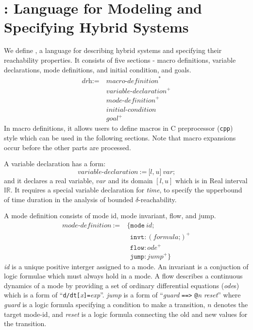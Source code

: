 \section{\drh{}: Language for Modeling and Specifying Hybrid Systems}

We define \drh{}, a language for describing hybrid systems and
specifying their reachability properties. It consists of five sections
- macro definitions, variable declarations, mode definitions, and
initial condition, and goals.
\begin{align*}
  \textit{drh} := \ & \textit{macro-definition}^*\\
                    & \textit{variable-declaration}^+\\
                    & \textit{mode-definition}^+\\
                    & \textit{initial-condition}\\
                    & \textit{goal}^+
\end{align*}
In macro definitions, it allows users to define macros in C
preprocessor (\texttt{cpp}) style which can be used in the following
sections. Note that macro expansions occur before the other parts are processed.

A variable declaration has a form:
\[
\textit{variable-declaration} \ := \ \texttt{[}
                                     \textit{l}
                                     \texttt{,}
                                     \ \textit{u}
                                     \texttt{]}
                                     \ \textit{var}
                                     \texttt{;}
\]
and it declares a real variable, $var$ and its domain $[l, u]$ which
is in Real interval $\mathbb{IR}$. It requires a special variable
declaration for \textit{time}, to specify the upperbound of time
duration in the analysis of bounded $\delta$-reachability.

A mode definition consists of mode id, mode invariant, flow, and jump.
\begin{align*}
  \textit{mode-definition} \ := & \ \texttt{\{}
                                    \texttt{mode} \ \textit{id}\texttt{;}\\
                           & \ \ \  \texttt{invt}:(\textit{formula} \texttt{;})^+\\
                           & \ \ \  \texttt{flow}:\textit{ode}^+\\
                           & \ \ \ \texttt{jump}:\textit{jump}^+ \texttt{\}}
\end{align*}
\textit{id} is a unique positive interger assigned to a mode. An
invariant is a conjuction of logic formulae which must always hold in
a mode. A flow describes a continuous dynamics of a mode by providing
a set of ordinary differential equations (\textit{ode}s) which is a
form of
``\texttt{d/dt[}\textit{x}\texttt{]=}\textit{exp}''. \textit{jump} is
a form of ``\textit{guard} \texttt{==>} \texttt{@}\textit{n}
\textit{reset}'' where \textit{guard} is a logic formula specifying a
condition to make a transition, $n$ denotes the target mode-id, and
\textit{reset} is a logic formula connecting the old and new values
for the transition.

